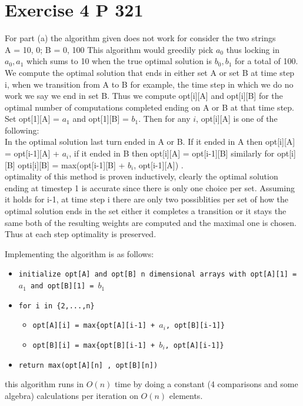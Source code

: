\documentclass{amsart}
\begin{document}
\section{Exercise 4 P 321}
For part (a) the algorithm given does not work for consider the two strings\\
A = 10, 0; B = 0, 100
This algorithm would greedily pick $a_0$ thus locking in $a_0,a_1$ which sums to 10 when the true optimal solution is $b_0,b_1$ for a total of 100.
\\
We compute the optimal solution that ends in either set A or set B at time step i, when we transition from A to B for example, the time step in which we do no work
we say we end in set B. Thus we compute
opt[i][A] and opt[i][B] for the optimal number of computations completed ending on A or B at that time step. Set opt[1][A] = $a_1$ and opt[1][B] = $b_1$.
Then for any $i$, opt[i][A] is one of the following:\\
In the optimal solution last turn ended in A or B. If it ended in A then opt[i][A] = opt[i-1][A] + $a_i$, if it ended in B then opt[i][A] = opt[i-1][B]
similarly for opt[i][B]
opti[i][B] = max(opt[i-1][B] +  $b_i$, opt[i-1][A])
.\\
optimality of this method is proven inductively, clearly the optimal solution ending at timestep 1 is accurate since there is only one choice per set.
Assuming it holds for i-1, at time step i there are only two possiblities per set of how the optimal solution ends in the set either it completes a transition or it stays the same
both of the resulting weights are computed and the maximal one is chosen. Thus at each step optimality is preserved.

Implementing the algorithm is as follows:
{\small
    \begin{itemize}
        \item \texttt{initialize opt[A] and opt[B] n dimensional arrays with opt[A][1] = $a_1$ and opt[B][1] = $b_1$}
        \item \texttt{for i in \{2,...,n\}}
            \begin{itemize}
                \item \texttt{opt[A][i] = max\{opt[A][i-1] + $a_i$, opt[B][i-1]\}}
                \item \texttt{opt[B][i] = max\{opt[B][i-1] + $b_i$, opt[A][i-1]\}}
            \end{itemize}
        \item \texttt{return max(opt[A][n] , opt[B][n])}
    \end{itemize}
}
this algorithm runs in $O(n)$ time by doing a constant (4 comparisons and some algebra) calculations per iteration on $O(n)$ elements.
\end{document}
